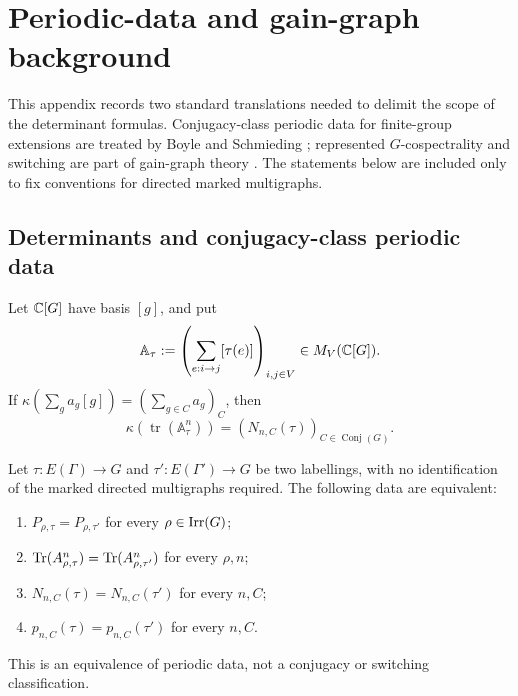 \section{Periodic-data and gain-graph background}
\label{sec:inverse-background}

This appendix records two standard translations needed to delimit the scope
of the determinant formulas.  Conjugacy-class periodic data for finite-group
extensions are treated by Boyle and Schmieding
\cite{BoyleSchmieding2017FiniteGroupExtensions}; represented
\(G\)-cospectrality and switching are part of gain-graph theory
\cite{Zaslavsky1989BiasedGraphs,CavaleriDAngeliDonno2021BalanceGainGraphs,
CavaleriDonno2022Cospectrality}.  The statements below are included only to
fix conventions for directed marked multigraphs.

\subsection{Determinants and conjugacy-class periodic data}

Let \(\mathbb{C}[G]\) have basis \([g]\), and put
\[
 \mathbb A_\tau:=
 \left(\sum_{e:i\to j}[\tau(e)]\right)_{i,j\in V}\in M_V(\mathbb{C}[G]).
\]
If \(\kappa(\sum_ga_g[g])=(\sum_{g\in C}a_g)_C\), then
\begin{equation}\label{eq:appendix-kappa-periodic-data}
 \kappa\!\left(\operatorname{tr}(\mathbb A_\tau^n)\right)
   =(N_{n,C}(\tau))_{C\in\operatorname{Conj}(G)}.
\end{equation}

\begin{proposition}
\label{prop:comparison-dictionary}
Let \(\tau:E(\Gamma)\to G\) and
\(\tau':E(\Gamma')\to G\) be two labellings, with no identification of the
marked directed multigraphs required.  The following data are equivalent:
\begin{enumerate}[label=\textup{(\roman*)},leftmargin=*]
 \item \(P_{\rho,\tau}=P_{\rho,\tau'}\) for every
   \(\rho\in\operatorname{Irr}(G)\);
 \item \(\operatorname{Tr}(A_{\rho,\tau}^n)=\operatorname{Tr}(A_{\rho,\tau'}^n)\) for every \(\rho,n\);
 \item \(N_{n,C}(\tau)=N_{n,C}(\tau')\) for every \(n,C\);
 \item \(p_{n,C}(\tau)=p_{n,C}(\tau')\) for every \(n,C\).
\end{enumerate}
This is an equivalence of periodic data, not a conjugacy or switching
classification.
\end{proposition}

